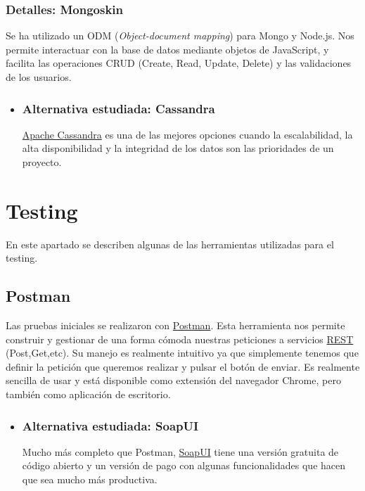 \subsubsection{Detalles: Mongoskin}\label{mongoskin}
Se ha utilizado un ODM (\emph{Object-document mapping}) para Mongo y Node.js. Nos permite interactuar con la base de datos mediante objetos de JavaScript, y facilita las operaciones CRUD (Create, Read, Update, Delete) y las validaciones de los usuarios.

\begin{itemize}
	\item	\subsubsection{Alternativa estudiada: Cassandra}\label{cassandra}
	\hyperlink{https://www.cassandra.apache.org/}{Apache Cassandra} es una de las mejores opciones cuando la escalabilidad, la alta disponibilidad y la integridad de los datos son las prioridades de un proyecto.
\end{itemize}


\section{Testing}\label{testing}
En este apartado se describen algunas de las herramientas utilizadas para el testing.


\subsection{Postman}\label{postman}
Las pruebas iniciales se realizaron con  \hyperlink{https://www.getpostman.com}{Postman}. Esta herramienta nos permite construir y gestionar de una forma cómoda nuestras peticiones a servicios \hyperlink{https://es.wikipedia.org/wiki/Transferencia_de_Estado_Representacional}{REST} (Post,Get,etc). Su manejo es realmente intuitivo ya que simplemente tenemos que definir la petición que queremos realizar y pulsar el botón de enviar. Es realmente sencilla de usar y está disponible como extensión del navegador Chrome, pero también como aplicación de escritorio.

\begin{itemize}
	\item	\subsubsection{Alternativa estudiada: SoapUI}
	Mucho más completo que Postman, \hyperlink{https://www.soapui.org/}{SoapUI} tiene una versión gratuita de código abierto y un versión de pago con algunas funcionalidades que hacen que sea mucho más productiva.

\end{itemize}

